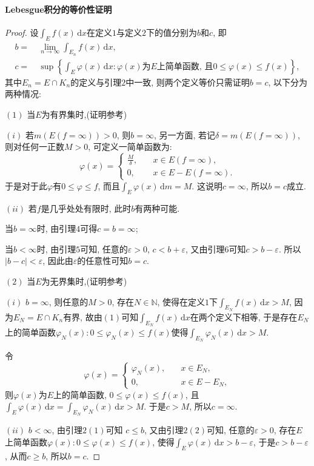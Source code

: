 \documentclass[12pt, a4paper, oneside]{ctexart}
\numberwithin{equation}{section}  %
\let\leq=\leqslant %
\let\geq=\geqslant %
\def\N{\mathbb{N}}
\def\d{\mathrm{d}}          %
\def\add{\vspace{1ex}}      %
\begin{document}
\paragraph*{Lebesgue积分的等价性证明}
\begin{proof}
    设$\int_Ef(x)\,\d x$在定义$1$与定义$2$下的值分别为$b$和$c$, 即
    \begin{align*}
        b =&\ \lim_{n\to\infty}\int_{E_n}f(x)\,\d x,\\
        c =&\ \sup\left\{\int_E\varphi(x)\,\d x:\varphi(x)\text{为}E\text{上简单函数, 且}0\leq \varphi(x)\leq f(x)\right\},
    \end{align*}
    其中$E_n=E\cap K_n$的定义与引理$2$中一致, 则两个定义等价只需证明$b=c$, 以下分为两种情况:

    $(1)$ 当$E$为有界集时,(证明参考\cite{sbhs})
    
    $(i)$ 若$m(E(f=\infty))>0$, 则$b=\infty$, 另一方面, 若记$\delta = m(E(f=\infty))$, 则对任何一正数$M>0$, 可定义一简单函数为:
    \begin{equation*}
        \varphi(x)=\begin{cases}
            \frac{M}{\delta},&\quad x\in E(f=\infty),\\
            0,&\quad x\in E-E(f=\infty).
        \end{cases}
    \end{equation*}
    于是对于此$\varphi$有$0\leq \varphi\leq f$, 而且$\int_{E}\varphi(x)\,\d m = M$. 这说明$c=\infty$, 所以$b=c$成立.\add

    $(ii)$ 若$f$是几乎处处有限时, 此时$b$有两种可能.
    
    当$b=\infty$时, 由引理$4$可得$c=b=\infty$;
    
    当$b<\infty$时, 由引理$5$可知, 任意的$\varepsilon > 0$, $c < b+\varepsilon$, 又由引理$6$可知$c>b-\varepsilon$. 所以$|b-c| < \varepsilon$, 因此由$\varepsilon$的任意性可知$b=c$.

    $(2)$ 当$E$为无界集时,(证明参考\cite{djx})
    
    $(i)$ $b=\infty$, 则任意的$M>0$, 存在$N\in \N$, 使得在定义$1$下$\int_{E_N}f(x)\,\d x>M$, 因为$E_N = E\cap K_n$有界, 故由$(1)$可知$\int_{E_N}f(x)\,\d x$在两个定义下相等, 于是存在$E_N$上的简单函数$\varphi_N(x):0\leq \varphi_N(x)\leq f(x)$使得$\int_{E_N}\varphi_N(x)\,\d x > M$.

    令
    \begin{equation*}
        \varphi(x) = \begin{cases}
            \varphi_N(x), &\quad x\in E_N,\\
            0,&\quad x\in E-E_N,
        \end{cases}
    \end{equation*}
    则$\varphi(x)$为$E$上的简单函数, $0\leq \varphi(x)\leq f(x)$, 且$\int_E\varphi(x)\,\d x=\int_{E_N}\varphi_N(x)\,\d x > M$. 于是$c>M$, 所以$c=\infty$.

    $(ii)$ $b < \infty$, 由引理$2(1)$可知 $c\leq b$, 又由引理$2(2)$可知, 任意的$\varepsilon > 0$, 存在$E$上简单函数$\varphi(x):0\leq \varphi(x)\leq f(x)$, 使得$\int_E\varphi(x)\,\d x > b-\varepsilon$, 于是$c>b-\varepsilon$, 从而$c\geq b$, 所以$b=c$.

\end{proof}
\end{document}

